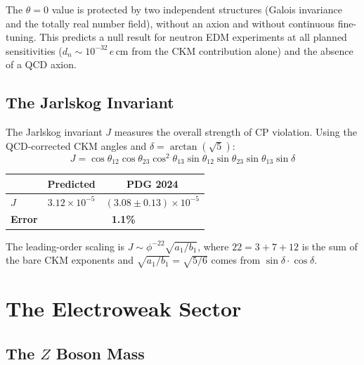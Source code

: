 \documentclass[12pt,a4paper]{article}
\theoremstyle{definition}
\begin{document}
The $\theta = 0$ value is protected by two independent structures (Galois invariance and the totally real number field), without an axion and without continuous fine-tuning.  This predicts a null result for neutron EDM experiments at all planned sensitivities ($d_n \sim 10^{-32}\,e\,\text{cm}$ from the CKM contribution alone) and the absence of a QCD axion.

\subsection{The Jarlskog Invariant}

The Jarlskog invariant $J$ measures the overall strength of CP violation. Using the QCD-corrected CKM angles and $\delta = \arctan(\sqrt{5})$:
\begin{equation}
J = \cos\theta_{12}\cos\theta_{23}\cos^2\theta_{13}\sin\theta_{12}\sin\theta_{23}\sin\theta_{13}\sin\delta
\end{equation}
\begin{center}
\begin{tabular}{lcc}
\toprule
& \textbf{Predicted} & \textbf{PDG 2024} \\
\midrule
$J$ & $3.12 \times 10^{-5}$ & $(3.08 \pm 0.13) \times 10^{-5}$ \\
\textbf{Error} & \multicolumn{2}{c}{\textbf{1.1\%}} \\
\bottomrule
\end{tabular}
\end{center}
The leading-order scaling is $J \sim \phi^{-22} \sqrt{a_1/b_1}$, where $22 = 3 + 7 + 12$ is the sum of the bare CKM exponents and $\sqrt{a_1/b_1} = \sqrt{5/6}$ comes from $\sin\delta \cdot \cos\delta$.



\section{The Electroweak Sector}
\label{sec:ew}

\subsection{The \texorpdfstring{$Z$}{Z} Boson Mass}
\end{document}
